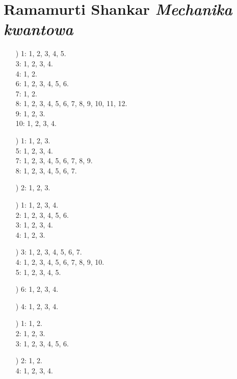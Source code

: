 \documentclass[a4paper,11pt]{article}
\numberwithin{equation}{section}
\begin{document}
\section{Ramamurti Shankar \textit{Mechanika kwantowa}}

\label{sec:Oznaczenia-i-konwencje}


\begin{itemize}

\item[\romannumeral1)] 1: 1, 2, 3, 4, 5. \\
  3: 1, 2, 3, 4. \\
  4: 1, 2. \\
  6: 1, 2, 3, 4, 5, 6. \\
  7: 1, 2. \\
  8: 1, 2, 3, 4, 5, 6, 7, 8, 9, 10, 11, 12. \\
  9: 1, 2, 3. \\
  10: 1, 2, 3, 4.

\item[\romannumeral2)] 1: 1, 2, 3. \\
  5: 1, 2, 3, 4. \\
  7: 1, 2, 3, 4, 5, 6, 7, 8, 9. \\
  8: 1, 2, 3, 4, 5, 6, 7.

\item[\romannumeral4)] 2: 1, 2, 3.

\item[\romannumeral5)] 1: 1, 2, 3, 4. \\
  2: 1, 2, 3, 4, 5, 6. \\
  3: 1, 2, 3, 4. \\
  4: 1, 2, 3.

\item[\romannumeral7)] 3: 1, 2, 3, 4, 5, 6, 7. \\
  4: 1, 2, 3, 4, 5, 6, 7, 8, 9, 10. \\
  5: 1, 2, 3, 4, 5.

\item[\romannumeral8)] 6: 1, 2, 3, 4.

\item[\romannumeral9)] 4: 1, 2, 3, 4.

\item[\romannumeral10)] 1: 1, 2. \\
  2: 1, 2, 3. \\
  3: 1, 2, 3, 4, 5, 6.

\item[\romannumeral11)] 2: 1, 2. \\
  4: 1, 2, 3, 4.


\end{itemize}
\end{document}
